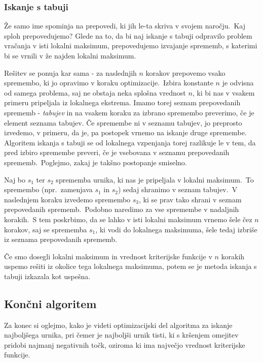 \documentclass[a4paper,10pt]{article}
\begin{document}
\subsubsection{Iskanje s tabuji}

Že samo ime spominja na prepovedi, ki jih le-ta skriva v svojem naročju.\ Kaj sploh prepovedujemo?
Glede na to, da bi naj iskanje s tabuji odpravilo problem vračanja v isti lokalni maksimum,
prepovedujemo izvajanje sprememb, s katerimi bi se vrnili v že najden lokalni maksimum.

Rešitev se ponuja kar sama - za naslednjih $n$ korakov prepovemo vsako spremembo, ki jo
opravimo v koraku optimizacije.\ Izbira konstante $n$ je odvisna od samega problema, saj
ne obstaja neka splošna vrednost $n$, ki bi nas v vsakem primeru pripeljala iz lokalnega ekstrema.
Imamo torej seznam prepovedanih sprememb - \emph{tabujev} in na vsakem koraku za izbrano
spremembo preverimo, če je element seznama tabujev. Če spremembe ni v seznamu tabujev, jo
preprosto izvedemo, v primeru, da je, pa postopek vrnemo na iskanje druge spremembe.
Algoritem iskanja s tabuji se od lokalnega vzpenjanja torej razlikuje le v tem, da pred
izbiro spremembe preveri, če je vsebovana v seznamu prepovedanih sprememb.\ Poglejmo, zakaj
je takšno postopanje smiselno.

Naj bo $s_1$ ter $s_2$ sprememba urnika, ki nas je pripeljala v lokalni maksimum.\ To
spremembo (npr.\ zamenjava $s_1$ in $s_2$) sedaj shranimo v
seznam tabujev.\ V naslednjem koraku izvedemo spremembo $s_3$, ki se prav tako shrani v
seznam prepovedanih sprememb.\ Podobno naredimo za vse spremembe v nadaljnih korakih.\ S
 tem poskrbimo, da se lahko v isti lokalni maksimum vrnemo šele čez $n$ korakov, saj
se sprememba $s_1$, ki vodi do lokalnega maksimuma, šele tedaj izbriše iz seznama
prepovedanih sprememb.

Če smo dosegli lokalni maksimum in vrednost kriterijske funkcije v $n$ korakih uspemo
rešiti iz okolice tega lokalnega maksimuma, potem se je metoda iskanja s tabuji izkazala
kot uspešna.

\subsection{Končni algoritem}

Za konec si oglejmo, kako je videti optimizacijski del algoritma za iskanje najboljšega
urnika, pri čemer je najboljši urnik tisti, ki s kršenjem omejitev pridobi najmanj negativnih
točk, oziroma ki ima največjo vrednost kriterijske funkcije.
\end{document}
